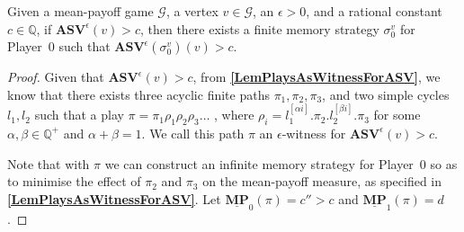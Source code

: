 \begin{lemma}
\label{LemFinMemWitnessASV}
Given a mean-payoff game $\mathcal{G}$, a vertex $v \in \mathcal{G}$, an $\epsilon > 0$, and a rational constant $c \in \mathbb{Q}$, if $\mathbf{ASV}^{\epsilon}(v) > c$, then there exists a finite memory strategy $\sigma_0^v$ for Player~0 such that $\mathbf{ASV}^{\epsilon}(\sigma_0^v)(v) > c$.
\end{lemma}

\begin{proof}
Given that $\mathbf{ASV}^{\epsilon}(v) > c$, from \textbf{\cref{LemPlaysAsWitnessForASV}}, we know that there exists three acyclic finite paths $\pi_1, \pi_2, \pi_3$, and two simple cycles $l_1, l_2$ such that a play $\pi = \pi_1\rho_1\rho_2\rho_3\dots$ , where $\rho_i = l_1^{[\alpha i]}.\pi_2.l_2^{[\beta i]}.\pi_3$ for some $\alpha, \beta \in \mathbb{Q}^{+}$ and $\alpha + \beta = 1$. 
We call this path $\pi$ an  $\epsilon$-witness for $\mathbf{ASV}^{\epsilon}(v) > c$.

Note that with $\pi$ we can construct an infinite memory strategy for Player~0 so as to minimise the effect of $\pi_2$ and $\pi_3$ on the mean-payoff measure, as specified in \textbf{\cref{LemPlaysAsWitnessForASV}}.
Let $\underline{\mathbf{MP}}_0(\pi) = c'' > c$ and $\underline{\mathbf{MP}}_1(\pi) = d$.


\end{proof}
